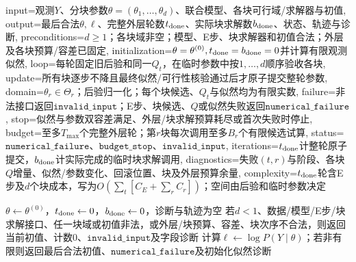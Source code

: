 \begin{AlgorithmContract}{
  input={观测$Y$、分块参数$\theta=(\theta_1,\ldots,\theta_d)$、联合模型、各块可行域/求解器与初值},
  output={最后合法$\theta,\ell$、完整外层轮数$t_{\rm done}$、实际块求解数$b_{\rm done}$、状态、轨迹与诊断},
  preconditions={$d\ge1$；各块域非空；模型、E步、块求解器和初值合法；外层及各块预算/容差已固定},
  initialization={$\theta=\theta^{(0)},t_{\rm done}=b_{\rm done}=0$并计算有限观测似然},
  loop={每轮固定旧后验和同一$Q_t$，在临时参数中按$1,\ldots,d$顺序验收各块},
  update={所有块逐步不降且最终似然/可行性核验通过后才原子提交整轮参数},
  domain={$\theta_r\in\Theta_r$；后验归一化；每个块候选、$Q_t$与似然均为有限实数},
  failure={非法接口返回$\mathtt{invalid\_input}$；E步、块候选、$Q$或似然失败返回$\mathtt{numerical\_failure}$},
  stop={似然与参数双容差满足、外层/块求解预算耗尽或首次失败时停止},
  budget={至多$T_{\max}$个完整外层轮；第$r$块每次调用至多$B_r$个有限候选试算},
  status={$\mathtt{numerical\_failure}$、$\mathtt{budget\_stop}$、$\mathtt{invalid\_input}$},
  iterations={$t_{\rm done}$计整轮原子提交，$b_{\rm done}$计实际完成的临时块求解调用},
  diagnostics={失败$(t,r)$与阶段、各块$Q$增量、似然/参数变化、回滚位置、块及外层预算余量},
  complexity={$t_{\rm done}$轮含E步及$d$个块成本，写为$O(\sum_t[C_E+\sum_r C_r])$；空间由后验和临时参数决定}
}
\begin{algorithm}[H]
\caption{逐参数块条件极大化的GEM}\label{alg:V3-C04-gem-block}
$\theta\leftarrow\theta^{(0)}$，$t_{\rm done}\leftarrow0$，$b_{\rm done}\leftarrow0$，诊断与轨迹为空\;
若$d<1$、数据/模型/E步/块求解接口、任一块域或初值非法，或外层/块预算、容差、块次序不合法，则返回当前初值、计数$0$、$\mathtt{invalid\_input}$及字段诊断\;
计算$\ell\leftarrow\log P(Y\mid\theta)$；若非有限则返回最后合法初值、$\mathtt{numerical\_failure}$及初始化似然诊断\;
\end{algorithm}
\end{AlgorithmContract}
